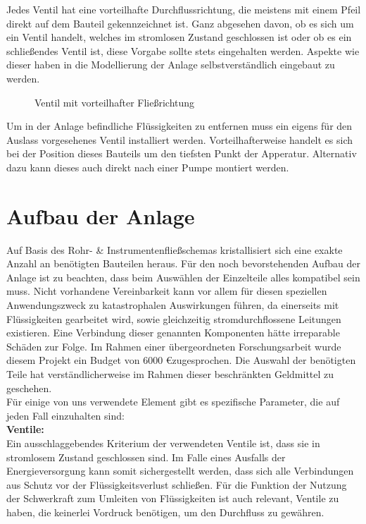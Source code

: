 Jedes Ventil hat eine vorteilhafte Durchflussrichtung, die meistens mit einem Pfeil direkt auf dem Bauteil gekennzeichnet ist. Ganz abgesehen davon, ob es sich um ein Ventil handelt, welches im stromlosen Zustand geschlossen ist oder ob es ein schließendes Ventil ist, diese Vorgabe sollte stets eingehalten werden. Aspekte wie dieser haben in die Modellierung der Anlage selbstverständlich eingebaut zu werden.\\


\begin{figure}[h!]
  \centering
  \caption{Ventil mit vorteilhafter Fließrichtung}
\end{figure}

Um in der Anlage befindliche Flüssigkeiten zu entfernen muss ein eigens für den Auslass vorgesehenes Ventil installiert werden. Vorteilhafterweise handelt es sich bei der Position dieses Bauteils um den tiefsten Punkt der Apperatur. Alternativ dazu kann dieses auch direkt nach einer Pumpe montiert werden.

\section{Aufbau der Anlage}
Auf Basis des Rohr- \& Instrumentenfließschemas kristallisiert sich eine exakte Anzahl an benötigten Bauteilen heraus. Für den noch bevorstehenden Aufbau der Anlage ist zu beachten, dass beim Auswählen der Einzelteile alles kompatibel sein muss. Nicht vorhandene Vereinbarkeit kann vor allem für diesen speziellen Anwendungszweck zu katastrophalen Auswirkungen führen, da einerseits mit Flüssigkeiten gearbeitet wird, sowie gleichzeitig stromdurchflossene Leitungen existieren. Eine Verbindung dieser genannten Komponenten hätte irreparable Schäden zur Folge. Im Rahmen einer übergeordneten Forschungsarbeit wurde diesem Projekt ein Budget von 6000 \euro \space zugesprochen. Die Auswahl der benötigten Teile hat verständlicherweise im Rahmen dieser beschränkten Geldmittel zu geschehen.\\
	
	Für einige von uns verwendete Element gibt es spezifische Parameter, die auf jeden Fall einzuhalten sind:\\
	
	\textbf{Ventile:}\\
	Ein ausschlaggebendes Kriterium der verwendeten Ventile ist, dass sie in stromlosem Zustand geschlossen sind. Im Falle eines Ausfalls der Energieversorgung kann somit sichergestellt werden, dass sich alle Verbindungen aus Schutz vor der Flüssigkeitsverlust schließen. Für die Funktion der Nutzung der Schwerkraft zum Umleiten von Flüssigkeiten ist auch relevant, Ventile zu haben, die keinerlei Vordruck benötigen, um den Durchfluss zu gewähren.\\

